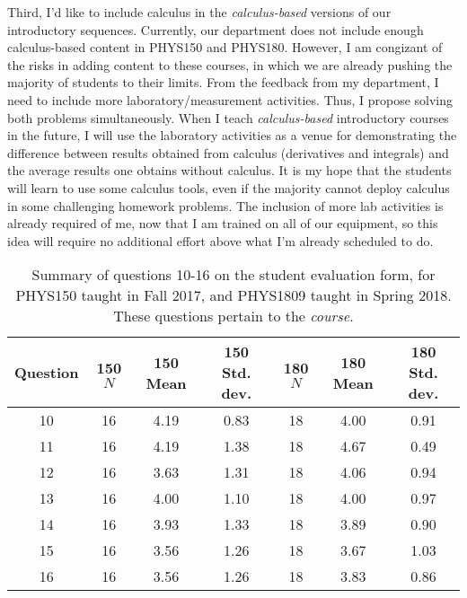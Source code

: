 \documentclass[../../main.tex]{subfiles}
\begin{document}
Third, I'd like to include calculus in the \textit{calculus-based} versions of our introductory sequences.  Currently, our department does not include enough calculus-based content in PHYS150 and PHYS180.  However, I am congizant of the risks in adding content to these courses, in which we are already pushing the majority of students to their limits.  From the feedback from my department, I need to include more laboratory/measurement activities.  Thus, I propose solving both problems simultaneously.  When I teach \textit{calculus-based} introductory courses in the future, I will use the laboratory activities as a venue for demonstrating the difference between results obtained from calculus (derivatives and integrals) and the average results one obtains without calculus. It is my hope that the students will learn to use some calculus tools, even if the majority cannot deploy calculus in some challenging homework problems.  The inclusion of more lab activities is already required of me, now that I am trained on all of our equipment, so this idea will require no additional effort above what I'm already scheduled to do. \\ \hspace{0.1cm}

\begin{table}
\small
\centering
\begin{tabular}{| c | c | c | c | c | c | c |}
\hline \hline
Question & 150 $N$ & 150 Mean & 150 Std. dev. & 180 $N$ & 180 Mean & 180 Std. dev. \\ \hline
10 & 16 & 4.19 & 0.83 & 18 & 4.00 & 0.91 \\ \hline
11 & 16 & 4.19 & 1.38 & 18 & 4.67 & 0.49 \\ \hline
12 & 16 & 3.63 & 1.31 & 18 & 4.06 & 0.94 \\ \hline
13 & 16 & 4.00 & 1.10 & 18 & 4.00 & 0.97 \\ \hline
14 & 16 & 3.93 & 1.33 & 18 & 3.89 & 0.90 \\ \hline
15 & 16 & 3.56 & 1.26 & 18 & 3.67 & 1.03 \\ \hline
16 & 16 & 3.56 & 1.26 & 18 & 3.83 & 0.86 \\ \hline
\hline
\end{tabular}
\caption{\label{tab:courses:intro_eval_3} Summary of questions 10-16 on the student evaluation form, for PHYS150 taught in Fall 2017, and PHYS1809 taught in Spring 2018.  These questions pertain to the \textit{course}.}
\end{table}
\end{document}
